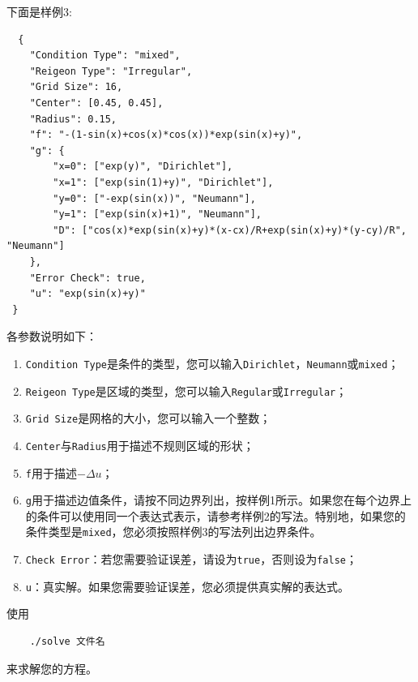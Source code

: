 \documentclass[lang=cn,11pt,a4paper]{elegantpaper}
\begin{document}
下面是样例3:
\begin{lstlisting}
  {
    "Condition Type": "mixed",
    "Reigeon Type": "Irregular",
    "Grid Size": 16,
    "Center": [0.45, 0.45],
    "Radius": 0.15,
    "f": "-(1-sin(x)+cos(x)*cos(x))*exp(sin(x)+y)",
    "g": {
        "x=0": ["exp(y)", "Dirichlet"],
        "x=1": ["exp(sin(1)+y)", "Dirichlet"],
        "y=0": ["-exp(sin(x))", "Neumann"],
        "y=1": ["exp(sin(x)+1)", "Neumann"],
        "D": ["cos(x)*exp(sin(x)+y)*(x-cx)/R+exp(sin(x)+y)*(y-cy)/R", "Neumann"]
    },
    "Error Check": true,
    "u": "exp(sin(x)+y)"
 }
\end{lstlisting}

各参数说明如下：

\begin{enumerate}[(1)]
\item \verb|Condition Type|是条件的类型，您可以输入\verb|Dirichlet|，\verb|Neumann|或\verb|mixed|；
\item \verb|Reigeon Type|是区域的类型，您可以输入\verb|Regular|或\verb|Irregular|；
\item \verb|Grid Size|是网格的大小，您可以输入一个整数；
\item \verb|Center|与\verb|Radius|用于描述不规则区域的形状；
\item \verb|f|用于描述$-\Delta u$；
\item \verb|g|用于描述边值条件，请按不同边界列出，按样例1所示。如果您在每个边界上的条件可以使用同一个表达式表示，请参考样例2的写法。特别地，如果您的条件类型是\verb|mixed|，您必须按照样例3的写法列出边界条件。
\item \verb|Check Error|：若您需要验证误差，请设为\verb|true|，否则设为\verb|false|；
\item \verb|u|：真实解。如果您需要验证误差，您必须提供真实解的表达式。
\end{enumerate}

使用
\begin{lstlisting}
    ./solve 文件名
\end{lstlisting}

来求解您的方程。
\end{document}
